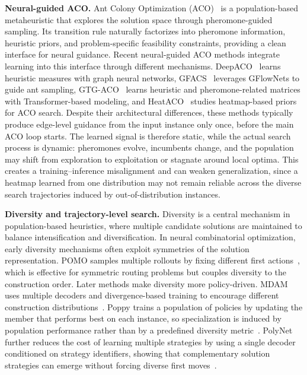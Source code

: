 \smallskip\noindent\textbf{Neural-guided ACO.}
Ant Colony Optimization (ACO)~\cite{ACO,maxmin} is a population-based metaheuristic that explores the solution space through pheromone-guided sampling. Its transition rule naturally factorizes into pheromone information, heuristic priors, and problem-specific feasibility constraints, providing a clean interface for neural guidance. Recent neural-guided ACO methods integrate learning into this interface through different mechanisms. DeepACO~\cite{deepaco} learns heuristic measures with graph neural networks, GFACS~\cite{gfacs} leverages GFlowNets to guide ant sampling, GTG-ACO~\cite{gtgaco} learns heuristic and pheromone-related matrices with Transformer-based modeling, and HeatACO~\cite{heataco} studies heatmap-based priors for ACO search. Despite their architectural differences, these methods typically produce edge-level guidance from the input instance only once, before the main ACO loop starts. The learned signal is therefore static, while the actual search process is dynamic: pheromones evolve, incumbents change, and the population may shift from exploration to exploitation or stagnate around local optima. This creates a training--inference misalignment and can weaken generalization, since a heatmap learned from one distribution may not remain reliable across the diverse search trajectories induced by out-of-distribution instances.

\smallskip\noindent\textbf{Diversity and trajectory-level search.}
Diversity is a central mechanism in population-based heuristics, where multiple candidate solutions are maintained to balance intensification and diversification. In neural combinatorial optimization, early diversity mechanisms often exploit symmetries of the solution representation. POMO samples multiple rollouts by fixing different first actions~\cite{pomo}, which is effective for symmetric routing problems but couples diversity to the construction order. Later methods make diversity more policy-driven. MDAM uses multiple decoders and divergence-based training to encourage different construction distributions~\cite{mdam}. Poppy trains a population of policies by updating the member that performs best on each instance, so specialization is induced by population performance rather than by a predefined diversity metric~\cite{poppy}. PolyNet further reduces the cost of learning multiple strategies by using a single decoder conditioned on strategy identifiers, showing that complementary solution strategies can emerge without forcing diverse first moves~\cite{polynet}.

